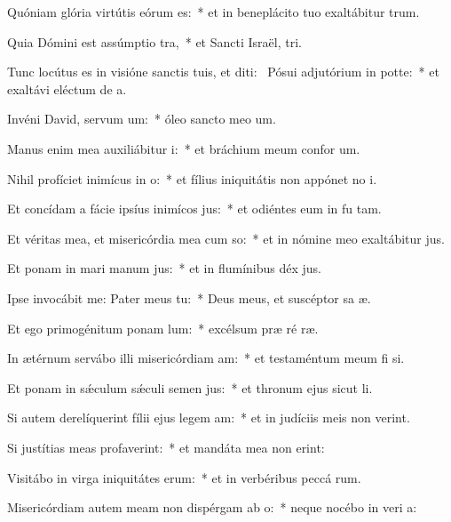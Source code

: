 \item Quóniam glória virtútis eórum  es:~* et in beneplácito tuo exaltábitur  trum.
\item Quia Dómini est assúmptio tra,~* et Sancti Israël,  tri.
\item Tunc locútus es in visióne sanctis tuis, et diti:~\pscross{} Pósui adjutórium in potte:~* et exaltávi eléctum de  a.
\item Invéni David, servum um:~* óleo sancto meo  um.
\item Manus enim mea auxiliábitur i:~* et bráchium meum confor um.
\item Nihil profíciet inimícus in o:~* et fílius iniquitátis non appónet no i.
\item Et concídam a fácie ipsíus inimícos jus:~* et odiéntes eum in fu tam.
\item Et véritas mea, et misericórdia mea cum so:~* et in nómine meo exaltábitur  jus.
\item Et ponam in mari manum jus:~* et in flumínibus déx jus.
\item Ipse invocábit me: Pater meus  tu:~* Deus meus, et suscéptor sa æ.
\item Et ego primogénitum ponam lum:~* excélsum præ ré ræ.
\item In ætérnum servábo illi misericórdiam am:~* et testaméntum meum fi si.
\item Et ponam in sǽculum sǽculi semen jus:~* et thronum ejus sicut  li.
\item Si autem derelíquerint fílii ejus legem am:~* et in judíciis meis non verint.
\item Si justítias meas profaverint:~* et mandáta mea non erint:
\item Visitábo in virga iniquitátes erum:~* et in verbéribus peccá rum.
\item Misericórdiam autem meam non dispérgam ab o:~* neque nocébo in veri a:
